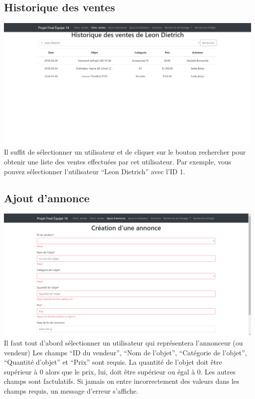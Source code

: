 \documentclass[a4paper,12pt]{article}
\begin{document}
\begin{spacing}{1}
    \subsection*{Historique des ventes}
    \includegraphics[scale=0.4]{historique_ventes.png}
Il suffit de sélectionner un utilisateur et de cliquer sur le bouton rechercher pour obtenir une liste des ventes effectuées par cet utilisateur. Par exemple, vous pouvez sélectionner l'utilisateur ``Leon Dietrich'' avec l'ID 1.
    \subsection*{Ajout d'annonce}
    \includegraphics[scale=0.4]{creation_annonce.png}
Il faut tout d'abord sélectionner un utilisateur qui représentera l'annonceur (ou vendeur)
Les champs ``ID du vendeur'', ``Nom de l'objet'', ``Catégorie de l'objet'', ``Quantité d'objet'' et  ``Prix'' sont requis.
La quantité de l'objet doit être supérieur à 0 alors que le prix, lui, doit être supérieur ou égal à 0.
Les autres champs sont factulatifs. Si jamais on entre incorrectement des valeurs dans les champs requis, un message d'erreur s'affiche.


\end{spacing}
\end{document}
